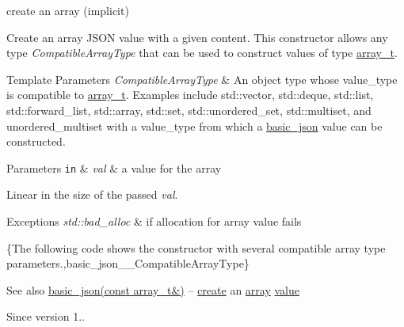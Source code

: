create an array (implicit) 

Create an array J\+S\+O\+N value with a given content. This constructor allows any type {\itshape Compatible\+Array\+Type} that can be used to construct values of type \hyperlink{classnlohmann_1_1basic__json_ab00b882d39306d663c23dab110f5cae0}{array\+\_\+t}.


\begin{DoxyTemplParams}{Template Parameters}
{\em Compatible\+Array\+Type} & An object type whose {\ttfamily value\+\_\+type} is compatible to \hyperlink{classnlohmann_1_1basic__json_ab00b882d39306d663c23dab110f5cae0}{array\+\_\+t}. Examples include {\ttfamily std\+::vector}, {\ttfamily std\+::deque}, {\ttfamily std\+::list}, {\ttfamily std\+::forward\+\_\+list}, {\ttfamily std\+::array}, {\ttfamily std\+::set}, {\ttfamily std\+::unordered\+\_\+set}, {\ttfamily std\+::multiset}, and {\ttfamily unordered\+\_\+multiset} with a {\ttfamily value\+\_\+type} from which a \hyperlink{classnlohmann_1_1basic__json}{basic\+\_\+json} value can be constructed.\\
\hline
\end{DoxyTemplParams}

\begin{DoxyParams}[1]{Parameters}
\mbox{\tt in}  & {\em val} & a value for the array\\
\hline
\end{DoxyParams}
Linear in the size of the passed {\itshape val}.


\begin{DoxyExceptions}{Exceptions}
{\em std\+::bad\+\_\+alloc} & if allocation for array value fails\\
\hline
\end{DoxyExceptions}
\{The following code shows the constructor with several compatible array type parameters.,basic\+\_\+json\+\_\+\+\_\+\+Compatible\+Array\+Type\}

\begin{DoxySeeAlso}{See also}
\hyperlink{classnlohmann_1_1basic__json_a3aaf41d385f0d9a93deb92f9b14ae0cf}{basic\+\_\+json(const array\+\_\+t\&)} -- \hyperlink{classnlohmann_1_1basic__json_a27df4303fbc83071275074486b54a40e}{create} an \hyperlink{classnlohmann_1_1basic__json_a5685815624b086caa532f41e853d4b0f}{array} \hyperlink{classnlohmann_1_1basic__json_a0a2cbbd95862a623e7dc5c37e67dead0}{value}
\end{DoxySeeAlso}
\begin{DoxySince}{Since}
version 1.. 
\end{DoxySince}



